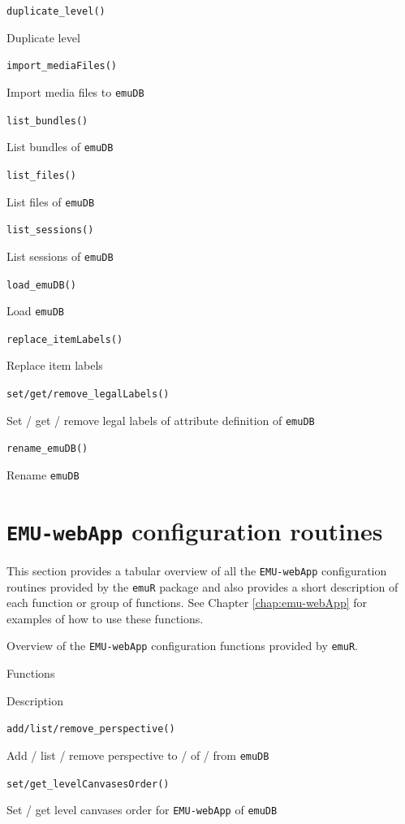 \documentclass[]{book}
\begin{document}
\texttt{duplicate\_level()}

Duplicate level

\texttt{import\_mediaFiles()}

Import media files to \texttt{emuDB}

\texttt{list\_bundles()}

List bundles of \texttt{emuDB}

\texttt{list\_files()}

List files of \texttt{emuDB}

\texttt{list\_sessions()}

List sessions of \texttt{emuDB}

\texttt{load\_emuDB()}

Load \texttt{emuDB}

\texttt{replace\_itemLabels()}

Replace item labels

\texttt{set/get/remove\_legalLabels()}

Set / get / remove legal labels of attribute definition of \texttt{emuDB}

\texttt{rename\_emuDB()}

Rename \texttt{emuDB}

\hypertarget{sec:emuRpackageDetails-emuWebAppConfig}{%
\section{\texorpdfstring{\texttt{EMU-webApp} configuration routines}{EMU-webApp configuration routines}}\label{sec:emuRpackageDetails-emuWebAppConfig}}

This section provides a tabular overview of all the \texttt{EMU-webApp} configuration routines provided by the \texttt{emuR} package and also provides a short description of each function or group of functions. See Chapter \ref{chap:emu-webApp} for examples of how to use these functions.

\label{tab:emuRpackageDetails-emuWebAppConfig}Overview of the \texttt{EMU-webApp} configuration functions provided by \texttt{emuR}.

Functions

Description

\texttt{add/list/remove\_perspective()}

Add / list / remove perspective to / of / from \texttt{emuDB}

\texttt{set/get\_levelCanvasesOrder()}

Set / get level canvases order for \texttt{EMU-webApp} of \texttt{emuDB}
\end{document}
